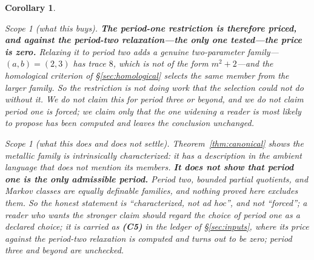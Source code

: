 \documentclass[11pt,reqno]{amsart}
\theoremstyle{plain}
\newtheorem{corollary}[theorem]{Corollary}
\theoremstyle{definition}
\theoremstyle{remark}
\newtheorem{scope}[theorem]{Scope}
\begin{document}
\begin{corollary}
\begin{scope}[what this buys]\label{sc:pricedperiod}
\textbf{The period-one restriction is therefore priced, and against the period-two
relaxation---the only one tested---the price is zero.} Relaxing
it to period two adds a genuine two-parameter family---$(a,b)=(2,3)$ has trace $8$,
which is not of the form $m^2+2$---and the homological criterion of
\S\ref{sec:homological} selects \emph{the same member} from the larger family. So the
restriction is not doing work that the selection could not do without it. We do not
claim this for period three or beyond, and we do not claim period one is forced; we
claim only that the one widening a reader is most likely to propose has been computed
and leaves the conclusion unchanged.
\end{scope}

\begin{scope}[what this does and does not settle]\label{sc:notunchosen}
Theorem~\ref{thm:canonical} shows the metallic family is \emph{intrinsically
characterized}: it has a description in the ambient language that does not mention its
members. \textbf{It does not show that period one is the only admissible period.}
Period two, bounded partial quotients, and Markov classes are equally definable
families, and nothing proved here excludes them. So the honest statement is
``characterized, not ad hoc'', and \emph{not} ``forced''; a reader who wants the
stronger claim should regard the choice of period one as a declared choice; it is
carried as \textbf{(C5)} in the ledger of \S\ref{sec:inputs}, where its price against the period-two
relaxation is computed and turns out to be \emph{zero}; period three and beyond are
unchecked.
\end{scope}
\end{corollary}
\end{document}
